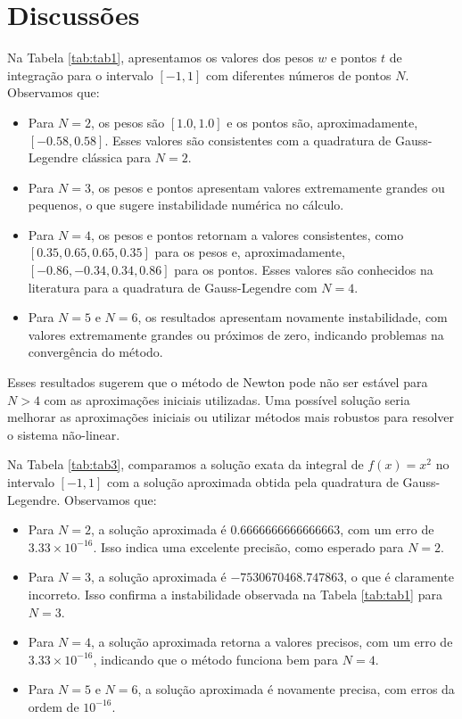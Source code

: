 \documentclass[12pt,letterpaper]{article}
\begin{document}
\section{Discussões}
Na Tabela \ref{tab:tab1}, apresentamos os valores dos pesos \( w \) e pontos \( t \) de integração para o intervalo \([-1, 1]\) com diferentes números de pontos \( N \). Observamos que:

\begin{itemize}
    \item Para \( N = 2 \), os pesos são \([1.0, 1.0]\) e os pontos são, aproximadamente, \([-0.58, 0.58]\). Esses valores são consistentes com a quadratura de Gauss-Legendre clássica para \( N = 2 \).
    \item Para \( N = 3 \), os pesos e pontos apresentam valores extremamente grandes ou pequenos, o que sugere instabilidade numérica no cálculo. 
    \item Para \( N = 4 \), os pesos e pontos retornam a valores consistentes, como \([0.35, 0.65, 0.65, 0.35]\) para os pesos e, aproximadamente, \([-0.86, -0.34, 0.34, 0.86]\) para os pontos. Esses valores são conhecidos na literatura para a quadratura de Gauss-Legendre com \( N = 4 \).
    \item Para \( N = 5 \) e \( N = 6 \), os resultados apresentam novamente instabilidade, com valores extremamente grandes ou próximos de zero, indicando problemas na convergência do método.
\end{itemize}

Esses resultados sugerem que o método de Newton pode não ser estável para \( N > 4 \) com as aproximações iniciais utilizadas. Uma possível solução seria melhorar as aproximações iniciais ou utilizar métodos mais robustos para resolver o sistema não-linear.

Na Tabela \ref{tab:tab3}, comparamos a solução exata da integral de \( f(x) = x^2 \) no intervalo \([-1, 1]\) com a solução aproximada obtida pela quadratura de Gauss-Legendre. Observamos que:
\begin{itemize}
    \item Para \( N = 2 \), a solução aproximada é \( 0.6666666666666663 \), com um erro de \( 3.33 \times 10^{-16} \). Isso indica uma excelente precisão, como esperado para \( N = 2 \).
    \item Para \( N = 3 \), a solução aproximada é \(-7530670468.747863\), o que é claramente incorreto. Isso confirma a instabilidade observada na Tabela \ref{tab:tab1} para \( N = 3 \).
    \item Para \( N = 4 \), a solução aproximada retorna a valores precisos, com um erro de \( 3.33 \times 10^{-16} \), indicando que o método funciona bem para \( N = 4 \).
    \item Para \( N = 5 \) e \( N = 6 \), a solução aproximada é novamente precisa, com erros da ordem de \( 10^{-16} \).
\end{itemize}
\end{document}
